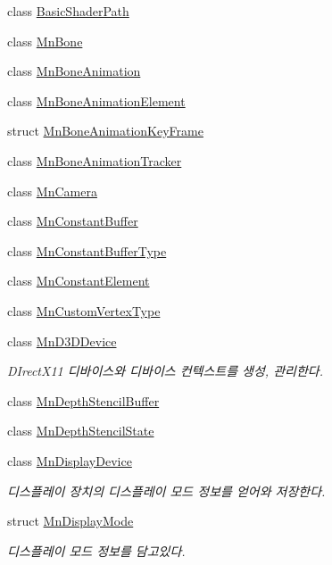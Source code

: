 \begin{DoxyCompactItemize}
\item 
class \hyperlink{class_m_n_l_1_1_basic_shader_path}{Basic\+Shader\+Path}
\item 
class \hyperlink{class_m_n_l_1_1_mn_bone}{Mn\+Bone}
\item 
class \hyperlink{class_m_n_l_1_1_mn_bone_animation}{Mn\+Bone\+Animation}
\item 
class \hyperlink{class_m_n_l_1_1_mn_bone_animation_element}{Mn\+Bone\+Animation\+Element}
\item 
struct \hyperlink{struct_m_n_l_1_1_mn_bone_animation_key_frame}{Mn\+Bone\+Animation\+Key\+Frame}
\item 
class \hyperlink{class_m_n_l_1_1_mn_bone_animation_tracker}{Mn\+Bone\+Animation\+Tracker}
\item 
class \hyperlink{class_m_n_l_1_1_mn_camera}{Mn\+Camera}
\item 
class \hyperlink{class_m_n_l_1_1_mn_constant_buffer}{Mn\+Constant\+Buffer}
\item 
class \hyperlink{class_m_n_l_1_1_mn_constant_buffer_type}{Mn\+Constant\+Buffer\+Type}
\item 
class \hyperlink{class_m_n_l_1_1_mn_constant_element}{Mn\+Constant\+Element}
\item 
class \hyperlink{class_m_n_l_1_1_mn_custom_vertex_type}{Mn\+Custom\+Vertex\+Type}
\item 
class \hyperlink{class_m_n_l_1_1_mn_d3_d_device}{Mn\+D3\+D\+Device}
\begin{DoxyCompactList}\small\item\em D\+Irect\+X11 디바이스와 디바이스 컨텍스트를 생성, 관리한다. \end{DoxyCompactList}\item 
class \hyperlink{class_m_n_l_1_1_mn_depth_stencil_buffer}{Mn\+Depth\+Stencil\+Buffer}
\item 
class \hyperlink{class_m_n_l_1_1_mn_depth_stencil_state}{Mn\+Depth\+Stencil\+State}
\item 
class \hyperlink{class_m_n_l_1_1_mn_display_device}{Mn\+Display\+Device}
\begin{DoxyCompactList}\small\item\em 디스플레이 장치의 디스플레이 모드 정보를 얻어와 저장한다. \end{DoxyCompactList}\item 
struct \hyperlink{struct_m_n_l_1_1_mn_display_mode}{Mn\+Display\+Mode}
\begin{DoxyCompactList}\small\item\em 디스플레이 모드 정보를 담고있다. \end{DoxyCompactList}\item 

\end{DoxyCompactItemize}
